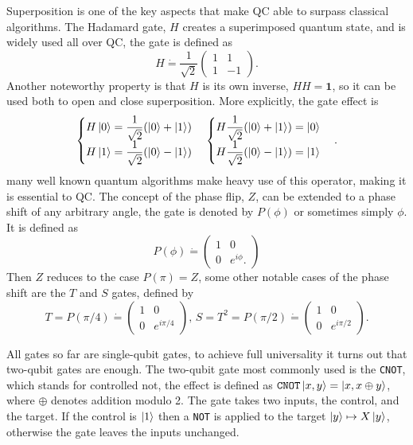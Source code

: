 Superposition is one of the key aspects that make QC able to surpass classical algorithms. The Hadamard gate, $H$ creates a superimposed quantum state, and is widely used all over QC, the gate is defined as
\begin{equation}
H \dot{=} \dfrac{1}{\sqrt{2}}\begin{pmatrix}
1 & 1 \\ 1 & -1
\end{pmatrix}.
\end{equation}
Another noteworthy property is that $H$ is its own inverse, $HH = \mathbf{1}$, so it can be used both to open and close superposition. More explicitly, the gate effect is 
\begin{equation}
\begin{cases}
H\ket{0} = \dfrac{1}{\sqrt{2}}(\ket{0} + \ket{1})
\\
H\ket{1} = \dfrac{1}{\sqrt{2}}(\ket{0} - \ket{1})
\end{cases}
\begin{cases}
H\dfrac{1}{\sqrt{2}}(\ket{0} + \ket{1}) = \ket{0}
\\
H\dfrac{1}{\sqrt{2}}(\ket{0} - \ket{1}) = \ket{1}
\end{cases}.
\end{equation}
many well known quantum algorithms make heavy use of this operator\cite{Grover,shor}, making it is essential to QC.
The concept of the phase flip, $Z$, can be extended to a phase shift of any arbitrary angle, the gate is denoted by $P(\phi)$ or sometimes simply $\phi$. It is defined as 
\begin{equation}
P(\phi) \dot{=} \begin{pmatrix}
1 & 0 \\
0 & e^{i\phi}.
\end{pmatrix}
\end{equation}
Then $Z$ reduces to the case $P(\pi) = Z$, some other notable cases of the phase shift are the $T$ and $S$ gates, defined by
\begin{equation}
T = P({\pi/4}) \dot{=} \begin{pmatrix}
1 & 0 \\ 0 & e^{i\pi/4}
\end{pmatrix},\, S = T^2 = P({\pi/2}) \dot{=} \begin{pmatrix}
1 & 0 \\ 0 & e^{i\pi/2}
\end{pmatrix}.
\end{equation}

All gates so far are single-qubit gates, to achieve full universality it turns out that two-qubit gates are enough. The two-qubit gate most commonly used is the {\tt CNOT}, which stands for controlled not, the effect is defined as ${\tt CNOT}\ket{x,y} = \ket{x,x\oplus y}$, where $\oplus$ denotes addition modulo 2. The gate takes two inputs, the control, and the target. If the control is $\ket{1}$ then a {\tt NOT} is applied to the target $\ket{y} \mapsto X\ket{y}$, otherwise the gate leaves the inputs unchanged.



